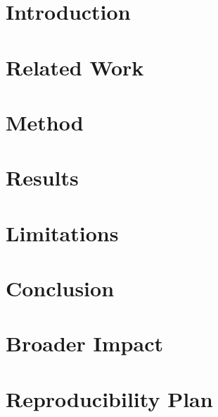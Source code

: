 \documentclass[twoside]{article}
\begin{document}

\begin{abstract}

\end{abstract}

\section{Introduction}\label{sec:introduction}


\section{Related Work}


\section{Method}\label{sec:method}


\section{Results}\label{sec:results}


\section{Limitations}


\section{Conclusion}


\section{Broader Impact}





\appendix
\section{Reproducibility Plan}

\end{document}
